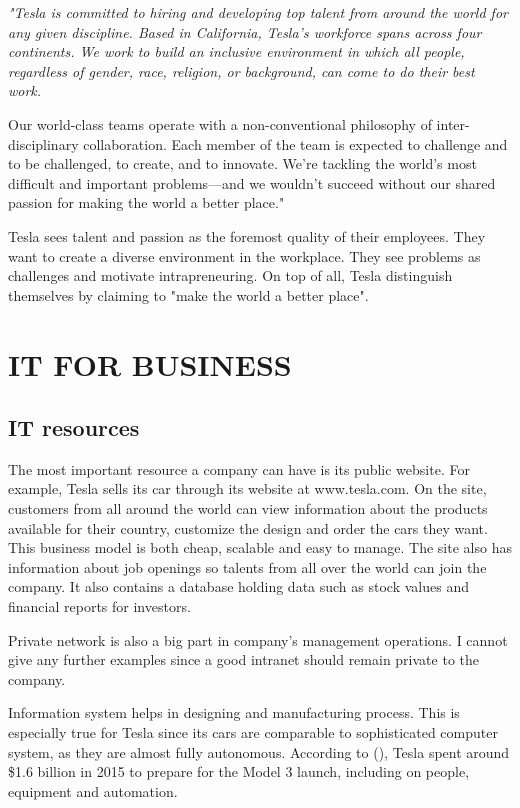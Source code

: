\documentclass[12pt]{article}
\begin{document}
{\itshape
"Tesla is committed to hiring and developing top talent from around the world for any given discipline. Based in California, Tesla's workforce spans across four continents. We work to build an inclusive environment in which all people, regardless of gender, race, religion, or background, can come to do their best work.

Our world-class teams operate with a non-conventional philosophy of inter-disciplinary collaboration. Each member of the team is expected to challenge and to be challenged, to create, and to innovate. We're tackling the world's most difficult and important problems—and we wouldn't succeed without our shared passion for making the world a better place."
}

Tesla sees talent and passion as the foremost quality of their employees. They want to create a diverse environment in the workplace. They see problems as challenges and motivate intrapreneuring. On top of all, Tesla distinguish themselves by claiming to "make the world a better place".

\section{IT FOR BUSINESS}

\subsection{IT resources}

The most important resource a company can have is its public website. For example, Tesla sells its car through its website at www.tesla.com. On the site, customers from all around the world can view information about the products available for their country, customize the design and order the cars they want. This business model is both cheap, scalable and easy to manage. The site also has information about job openings so talents from all over the world can join the company. It also contains a database holding data such as stock values and financial reports for investors.

Private network is also a big part in company's management operations. I cannot give any further examples since a good intranet should remain private to the company.

Information system helps in designing and manufacturing process. This is especially true for Tesla since its cars are comparable to sophisticated computer system, as they are almost fully autonomous. According to (\cite{ho16}), Tesla spent around \$1.6 billion in 2015 to prepare for the Model 3 launch, including on people, equipment and automation.
\end{document}
